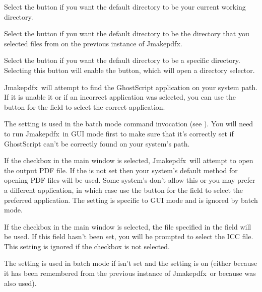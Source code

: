 \documentclass[toc=listof]{scrreport}
\newcommand{\Jmakepdfx}{Jmakepdfx}
\begin{document}
Select the  button if you want the
default directory to be your current working directory.

Select the  button if you want the
default directory to be the directory that you selected files from
on the previous instance of \Jmakepdfx.

Select the  button if you want the
default directory to be a specific directory. Selecting this button
will enable the  button, which will open a
directory selector.

\Jmakepdfx\ will attempt to find the GhostScript application on your
system path. If it is unable it or if an incorrect application was
selected, you can use the  button for the 
 field to select the correct application.

\begin{information}
The  setting is used in the batch mode
command invocation (see ). You will need to
run \Jmakepdfx\ in \gls{GUI} mode first to make sure that it's
correctly set if GhostScript can't be correctly found on your
system's path.
\end{information}

If the  checkbox in the main window is selected, 
\Jmakepdfx\ will attempt to open the output PDF file.
If the  is not set then 
your system's default method for opening PDF files will be used.
Some system's don't allow this or you may prefer a different
application, in which case use the  button for the
 field to select the preferred
application. The  setting is
specific to \gls{GUI} mode and is ignored by batch mode.

If the  checkbox in the main window is
selected, the file specified in the 
field will be used. If this field hasn't been set, you will be
prompted to select the \gls{ICC} file. This setting is ignored
if the  checkbox is not selected.

\begin{information}
The  setting is used in batch mode if
 isn't set and the 
setting is on (either because it has been remembered from the
previous instance of \Jmakepdfx\ or because  was also
used).
\end{information}
\end{document}
